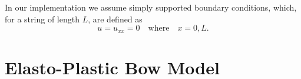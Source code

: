 \documentclass[twoside,a4paper]{article}
\begin{document}
In our implementation we assume simply supported boundary conditions, which, for a string of length $L$, are defined as
\begin{equation}
    u = u_{xx} = 0 \quad \text{where} \quad x = 0, L.
\end{equation}

\section{Elasto-Plastic Bow Model}\label{sec:elasto}
    
    
    
    

            
\end{document}
